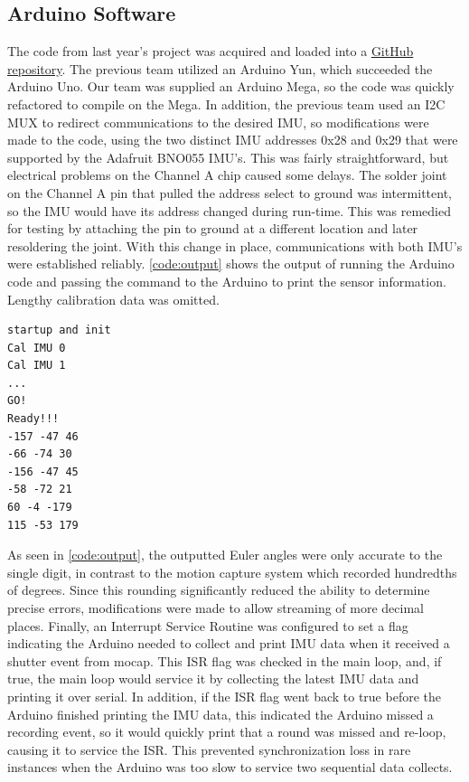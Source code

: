 \documentclass[letterpaper, 10 pt, conference]{ieeeconf}  %
\begin{document}
\subsection{Arduino Software}
The code from last year's project was acquired and loaded into a \href{https://github.com/ChrisBove/HandPoseTracking/}{GitHub repository}. The previous team utilized an Arduino Yun, which succeeded the Arduino Uno. Our team was supplied an Arduino Mega, so the code was quickly refactored to compile on the Mega. In addition, the previous team used an I2C MUX to redirect communications to the desired IMU, so modifications were made to the code, using the two distinct IMU addresses 0x28 and 0x29 that were supported by the Adafruit BNO055 IMU's. This was fairly straightforward, but electrical problems on the Channel A chip caused some delays. The solder joint on the Channel A pin that pulled the address select to ground was intermittent, so the IMU would have its address changed during run-time. This was remedied for testing by attaching the pin to ground at a different location and later resoldering the joint. With this change in place, communications with both IMU's were established reliably. \autoref{code:output} shows the output of running the Arduino code and passing the command to the Arduino to print the sensor information. Lengthy calibration data was omitted.

\begin{lstlisting}[frame=single, basicstyle=\small]
startup and init
Cal IMU 0
Cal IMU 1
...
GO!
Ready!!!
-157 -47 46
-66 -74 30
-156 -47 45
-58 -72 21
60 -4 -179
115 -53 179
\end{lstlisting}

As seen in \autoref{code:output}, the outputted Euler angles were only accurate to the single digit, in contrast to the motion capture system which recorded hundredths of degrees. Since this rounding significantly reduced the ability to determine precise errors, modifications were made to allow streaming of more decimal places. Finally, an Interrupt Service Routine was configured to set a flag indicating the Arduino needed to collect and print IMU data when it received a shutter event from mocap. This ISR flag was checked in the main loop, and, if true, the main loop would service it by collecting the latest IMU data and printing it over serial. In addition, if the ISR flag went back to true before the Arduino finished printing the IMU data, this indicated the Arduino missed a recording event, so it would quickly print that a round was missed and re-loop, causing it to service the ISR. This prevented synchronization loss in rare instances when the Arduino was too slow to service two sequential data collects.
\end{document}
